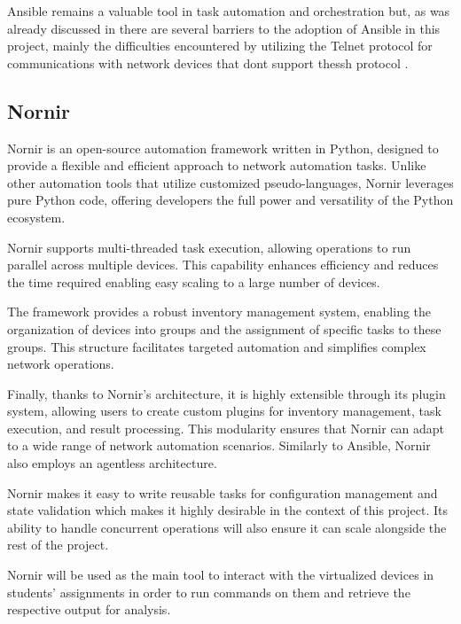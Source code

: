     Ansible remains a valuable tool in task automation and orchestration but, as was already discussed in\cite{santos2024} there are several 
    barriers to the adoption of Ansible in this project, mainly the difficulties encountered by utilizing the Telnet protocol for 
    communications with network devices that dont support the\ac{ssh} protocol .

  \subsection{Nornir}
  
    Nornir is an open-source automation framework written in Python, designed to provide a flexible and efficient 
    approach to network automation tasks\cite{nornir2025}. Unlike other automation tools that utilize customized 
    pseudo-languages, Nornir leverages pure Python code, offering developers the full power and versatility of the Python 
    ecosystem.

    Nornir supports multi-threaded task execution, allowing operations to run parallel across multiple devices.
    This capability enhances efficiency and reduces the time required enabling easy scaling to a large number of devices.

    The framework provides a robust inventory management system, enabling the organization of devices into groups and the 
    assignment of specific tasks to these groups. This structure facilitates targeted automation and simplifies complex 
    network operations.

    Finally, thanks to Nornir's architecture, it is highly extensible through its plugin system, allowing users to create 
    custom plugins for inventory management, task execution, and result processing. This modularity ensures that Nornir can 
    adapt to a wide range of network automation scenarios. Similarly to Ansible, Nornir also employs an agentless architecture.

    Nornir makes it easy to write reusable tasks for configuration management and state validation which makes it 
    highly desirable in the context of this project. Its ability to handle concurrent operations will also ensure it can scale 
    alongside the rest of the project.

    Nornir will be used as the main tool to interact with the virtualized devices in students' assignments in order to run commands 
    on them and retrieve the respective output for analysis.

